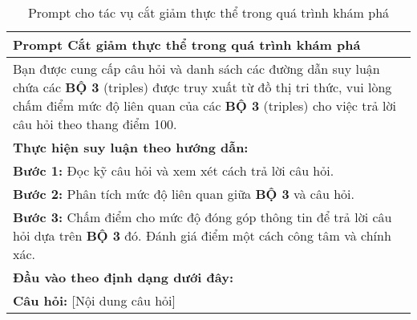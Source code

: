 \begin{table}[ht]
    \centering
    \caption{Prompt cho tác vụ cắt giảm thực thể trong quá trình khám phá}
    \label{tab:entity_prune_prompt}
    \small{\begin{tabular}{p{}}
            \toprule
            \textbf{Prompt Cắt giảm thực thể trong quá trình khám phá}                                                                                                                                                                                          \\
            \midrule
            Bạn được cung cấp câu hỏi và danh sách các đường dẫn suy luận chứa các \textbf{BỘ 3} (triples) được truy xuất từ đồ thị tri thức, vui lòng chấm điểm mức độ liên quan của các \textbf{BỘ 3} (triples) cho việc trả lời câu hỏi theo thang điểm 100. \\
            \textbf{Thực hiện suy luận theo hướng dẫn:}                                                                                                                                                                                                         \\
            \textbf{Bước 1:} Đọc kỹ câu hỏi và xem xét cách trả lời câu hỏi.                                                                                                                                                                                    \\
            \textbf{Bước 2:} Phân tích mức độ liên quan giữa \textbf{BỘ 3} và câu hỏi.                                                                                                                                                                          \\
            \textbf{Bước 3:} Chấm điểm cho mức độ đóng góp thông tin để trả lời câu hỏi dựa trên \textbf{BỘ 3} đó. Đánh giá điểm một cách công tâm và chính xác.                                                                                                \\
            \textbf{Đầu vào theo định dạng dưới đây:}                                                                                                                                                                                                           \\
            \textbf{Câu hỏi:} [Nội dung câu hỏi]                                                                                                                                                                                                                \\

\end{tabular}}
\end{table}
